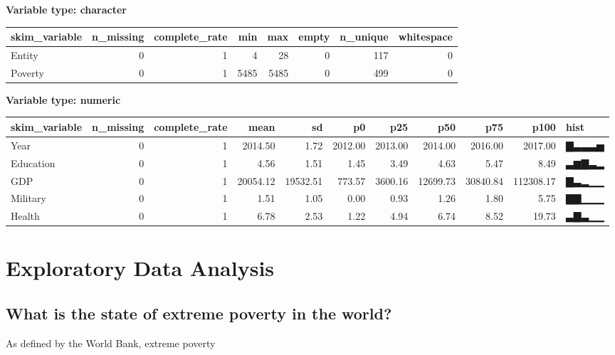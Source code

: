 \documentclass[
]{article}
\begin{document}
\textbf{Variable type: character}

\begin{longtable}[]{@{}lrrrrrrr@{}}
\toprule
skim\_variable & n\_missing & complete\_rate & min & max & empty &
n\_unique & whitespace \\
\midrule
\endhead
Entity & 0 & 1 & 4 & 28 & 0 & 117 & 0 \\
Poverty & 0 & 1 & 5485 & 5485 & 0 & 499 & 0 \\
\bottomrule
\end{longtable}

\textbf{Variable type: numeric}

\begin{longtable}[]{@{}lrrrrrrrrrl@{}}
\toprule
skim\_variable & n\_missing & complete\_rate & mean & sd & p0 & p25 &
p50 & p75 & p100 & hist \\
\midrule
\endhead
Year & 0 & 1 & 2014.50 & 1.72 & 2012.00 & 2013.00 & 2014.00 & 2016.00 &
2017.00 & ▇▃▃▃▅ \\
Education & 0 & 1 & 4.56 & 1.51 & 1.45 & 3.49 & 4.63 & 5.47 & 8.49 &
▃▆▇▃▂ \\
GDP & 0 & 1 & 20054.12 & 19532.51 & 773.57 & 3600.16 & 12699.73 &
30840.84 & 112308.17 & ▇▃▂▁▁ \\
Military & 0 & 1 & 1.51 & 1.05 & 0.00 & 0.93 & 1.26 & 1.80 & 5.75 &
▇▇▁▁▁ \\
Health & 0 & 1 & 6.78 & 2.53 & 1.22 & 4.94 & 6.74 & 8.52 & 19.73 &
▃▇▃▁▁ \\
\bottomrule
\end{longtable}

\hypertarget{exploratory-data-analysis-1}{%
\section{Exploratory Data Analysis}\label{exploratory-data-analysis-1}}

\hypertarget{what-is-the-state-of-extreme-poverty-in-the-world-1}{%
\subsection{What is the state of extreme poverty in the
world?}\label{what-is-the-state-of-extreme-poverty-in-the-world-1}}

As defined by the World Bank, extreme poverty
\end{document}
